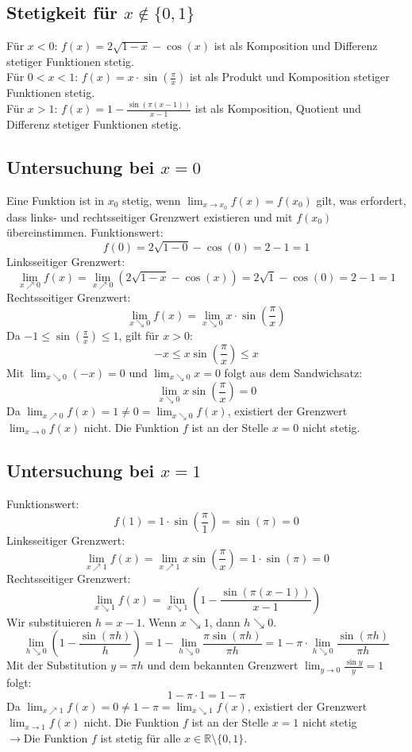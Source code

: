\documentclass{article}
\begin{document}
\subsection*{Stetigkeit für \(x \notin \{0, 1\}\)}
Für \(x < 0\): \(f(x) = 2\sqrt{1-x} - \cos(x)\) ist als Komposition und Differenz stetiger Funktionen stetig. \\
Für \(0 < x < 1\): \(f(x) = x \cdot \sin(\frac{\pi}{x})\) ist als Produkt und Komposition stetiger Funktionen stetig. \\
Für \(x > 1\): \(f(x) = 1 - \frac{\sin(\pi(x-1))}{x-1}\) ist als Komposition, Quotient und Differenz stetiger Funktionen stetig.

\subsection*{Untersuchung bei \(x = 0\)}
Eine Funktion ist in \(x_0\) stetig, wenn \(\lim_{x \to x_0} f(x) = f(x_0)\) gilt, was erfordert, dass links- und rechtsseitiger Grenzwert existieren und mit \(f(x_0)\) übereinstimmen.
Funktionswert:
\[f(0) = 2\sqrt{1-0} - \cos(0) = 2 - 1 = 1\]
Linksseitiger Grenzwert:
\[\lim_{x\nearrow0} f(x) = \lim_{x\nearrow0} (2\sqrt{1-x} - \cos(x)) = 2\sqrt{1} - \cos(0) = 2 - 1 = 1\]
Rechtsseitiger Grenzwert:
\[\lim_{x\searrow0} f(x) = \lim_{x\searrow0} x \cdot \sin\left(\frac{\pi}{x}\right)\]
Da \(-1 \le \sin(\frac{\pi}{x}) \le 1\), gilt für \(x > 0\):
\[-x \le x \sin\left(\frac{\pi}{x}\right) \le x\]
Mit \(\lim_{x\searrow0} (-x) = 0\) und \(\lim_{x\searrow0} x = 0\) folgt aus dem Sandwichsatz:
\[\lim_{x\searrow0} x \sin\left(\frac{\pi}{x}\right) = 0\]
Da \(\lim_{x\nearrow0} f(x) = 1 \ne 0 = \lim_{x\searrow0} f(x)\), existiert der Grenzwert \(\lim_{x\to0} f(x)\) nicht. Die Funktion \(f\) ist an der Stelle \(x=0\) nicht stetig.

\subsection*{Untersuchung bei \(x = 1\)}
Funktionswert:
\[f(1) = 1 \cdot \sin\left(\frac{\pi}{1}\right) = \sin(\pi) = 0\]
Linksseitiger Grenzwert:
\[\lim_{x\nearrow1} f(x) = \lim_{x\nearrow1} x \sin\left(\frac{\pi}{x}\right) = 1 \cdot \sin(\pi) = 0\]
Rechtsseitiger Grenzwert:
\[\lim_{x\searrow1} f(x) = \lim_{x\searrow1} \left(1 - \frac{\sin(\pi(x-1))}{x-1}\right)\]
Wir substituieren \(h = x-1\). Wenn \(x \searrow 1\), dann \(h \searrow 0\).
\[\lim_{h\searrow0} \left(1 - \frac{\sin(\pi h)}{h}\right) = 1 - \lim_{h\searrow0} \frac{\pi \sin(\pi h)}{\pi h} = 1 - \pi \cdot \lim_{h\searrow0} \frac{\sin(\pi h)}{\pi h}\]
Mit der Substitution \(y = \pi h\) und dem bekannten Grenzwert \(\lim_{y\to0} \frac{\sin y}{y} = 1\) folgt:
\[1 - \pi \cdot 1 = 1 - \pi\]
Da \(\lim_{x\nearrow1} f(x) = 0 \ne 1 - \pi = \lim_{x\searrow1} f(x)\), existiert der Grenzwert \(\lim_{x\to1} f(x)\) nicht. Die Funktion \(f\) ist an der Stelle \(x=1\) nicht stetig \\
\(\longrightarrow\)Die Funktion \(f\) ist stetig für alle \(x \in \mathbb{R} \setminus \{0, 1\}\).
\end{document}
